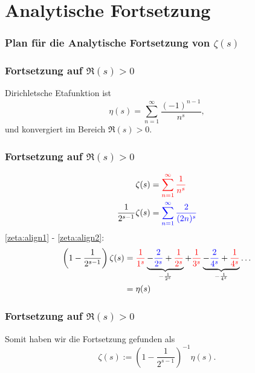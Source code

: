 \documentclass[ngerman, aspectratio=169]{beamer}
\newcommand*{\RD}{\textcolor{red}}
\newcommand*{\BL}{\textcolor{blue}}
\begin{document}
    \section{Analytische Fortsetzung}
    \begin{frame}
        \frametitle{Plan für die Analytische Fortsetzung von $\zeta(s)$}
        \begin{center}
            
        \end{center}
    \end{frame}
    \begin{frame}
        \frametitle{Fortsetzung auf $\Re(s) > 0$}
        Dirichletsche Etafunktion ist
        \begin{equation*}\label{zeta:equation:eta}
            \eta(s)
            =
            \sum_{n=1}^{\infty}
            \frac{(-1)^{n-1}}{n^s},
        \end{equation*}
        und konvergiert im Bereich $\Re(s) > 0$.
    \end{frame}
    \begin{frame}
        \frametitle{Fortsetzung auf $\Re(s) > 0$}
        \begin{align}
            \zeta(s)
            &=
            \RD{
            \sum_{n=1}^{\infty}
            \frac{1}{n^s} \label{zeta:align1}
            }
            \\
            \frac{1}{2^{s-1}}
            \zeta(s)
            &=
            \BL{
            \sum_{n=1}^{\infty}
            \frac{2}{(2n)^s} \label{zeta:align2}
            }
        \end{align}
        \pause
        \eqref{zeta:align1} - \eqref{zeta:align2}:
        \begin{align*}
            \left(1 - \frac{1}{2^{s-1}} \right)
            \zeta(s)
            &=
            \RD{\frac{1}{1^s}}
            \underbrace{-\BL{\frac{2}{2^s}} + \RD{\frac{1}{2^s}}}_{-\frac{1}{2^s}}
            + \RD{\frac{1}{3^s}}
            \underbrace{-\BL{\frac{2}{4^s}} + \RD{\frac{1}{4^s}}}_{-\frac{1}{4^s}}
            \ldots
            \\
            &= \eta(s)
        \end{align*}
    \end{frame}
    \begin{frame}
        \frametitle{Fortsetzung auf $\Re(s) > 0$}
        Somit haben wir die Fortsetzung gefunden als
        \begin{equation} \label{zeta:equation:fortsetzung1}
            \zeta(s)
            :=
            \left(1 - \frac{1}{2^{s-1}} \right)^{-1} \eta(s).
        \end{equation}
    \end{frame}
\end{document}
